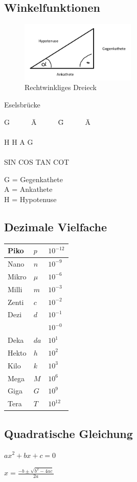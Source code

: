 \documentclass[12pt,a4paper]{article}
\begin{document}
\subsection{Winkelfunktionen}
\begin{figure}
\includegraphics[width=5.5cm]{bild3.png}
\caption{Rechtwinkliges Dreieck}
\end{figure}
Eselsbrücke
\begin{tabbing}
G~~~~~~\= A~~~~~~\= G~~~~~~\= A \\
\>\>\>\\
H\> H\> A\> G \\
\>\>\>\\
SIN\> COS\> TAN\> COT\\
\end{tabbing}
G = Gegenkathete\\
A = Ankathete\\
H = Hypotenuse
\subsection{Dezimale Vielfache}
\begin{tabular}{|l|l|l|}
\hline
Piko&$p$&$10^{-12}$\\
\hline
Nano&$n$&$10^{-9}$\\
\hline
Mikro&$\mu$&$10^{-6}$\\
\hline
Milli&$m$&$10^{-3}$\\
\hline
Zenti&$c$&$10^{-2}$\\
\hline
Dezi&$d$&$10^{-1}$\\
\hline
&&$10^{-0}$\\
\hline
Deka&$da$&$10^{1}$\\
\hline
Hekto&$h$&$10^{2}$\\
\hline
Kilo&$k$&$10^{3}$\\
\hline
Mega&$M$&$10^{6}$\\
\hline
Giga&$G$&$10^{9}$\\
\hline
Tera&$T$&$10^{12}$\\
\hline
\end{tabular}

\subsection{Quadratische Gleichung}
\begin{description}
\item $ax^{2}+bx+c=0$
\item $x=\frac{-b\pm \sqrt{b^{2}-4ac}}{2a}$
\end{description}
\end{document}
